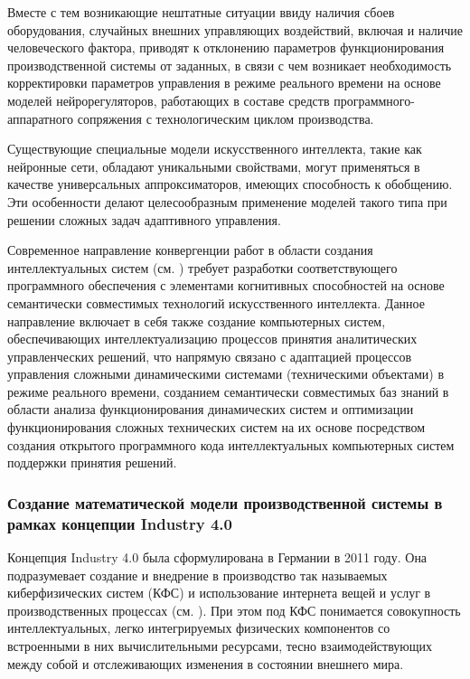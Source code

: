 Вместе с тем возникающие нештатные ситуации ввиду наличия сбоев оборудования, случайных внешних управляющих воздействий, включая и наличие человеческого фактора, приводят к отклонению параметров функционирования производственной системы от заданных, в связи с чем возникает необходимость корректировки параметров управления в режиме реального времени на основе моделей нейрорегуляторов, работающих в составе средств программного-аппаратного сопряжения с технологическим циклом производства.

Существующие специальные модели искусственного интеллекта, такие как нейронные сети, обладают уникальными свойствами, могут применяться в качестве универсальных аппроксиматоров, имеющих способность к обобщению. Эти особенности делают целесообразным применение моделей такого типа при решении сложных задач адаптивного управления.

Современное направление конвергенции работ в области создания интеллектуальных систем (см. ) требует разработки соответствующего программного обеспечения с элементами когнитивных способностей на основе семантически совместимых технологий искусственного интеллекта. Данное направление включает в себя также создание компьютерных систем, обеспечивающих интеллектуализацию процессов принятия аналитических управленческих решений, что напрямую связано с адаптацией процессов управления сложными динамическими системами (техническими объектами) в режиме реального времени, созданием семантически совместимых баз знаний в области анализа функционирования динамических систем и оптимизации функционирования сложных технических систем на их основе посредством создания открытого программного кода интеллектуальных компьютерных систем поддержки принятия решений.



\subsubsection{Создание математической модели производственной системы в рамках концепции Industry 4.0}
\label{sec_chapter_enterprise_model_creation_industry4}


Концепция Industry 4.0 была сформулирована в Германии в 2011 году. Она подразумевает создание и внедрение в производство так называемых киберфизических систем (КФС) и использование интернета вещей и услуг в производственных процессах (см. ). При этом под КФС понимается совокупность интеллектуальных, легко интегрируемых физических компонентов со встроенными в них вычислительными ресурсами, тесно взаимодействующих между собой и отслеживающих изменения в состоянии внешнего мира.

